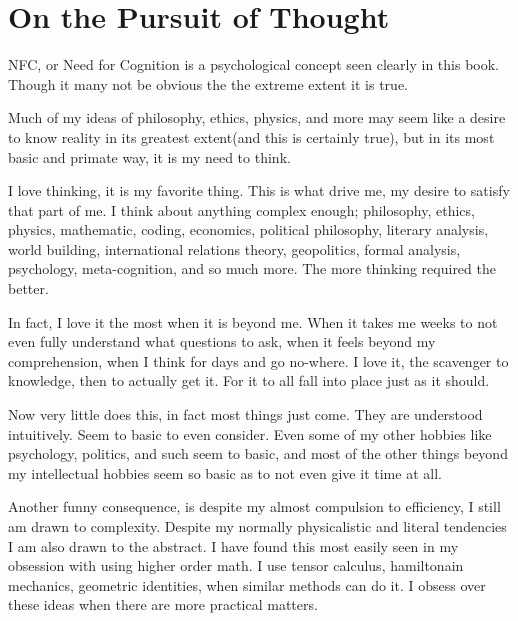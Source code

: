 \section{On the Pursuit of Thought}
\par NFC, or Need for Cognition is a psychological concept seen clearly in this book. Though it many not be obvious the the extreme extent it is true.
\par Much of my ideas of philosophy, ethics, physics, and more may seem like a desire to know reality in its greatest extent(and this is certainly true), but in its most basic and primate way, it is my need to think.
\par I love thinking, it is my favorite thing. This is what drive me, my desire to satisfy that part of me. I think about anything complex enough; philosophy, ethics, physics, mathematic, coding, economics, political philosophy, literary analysis, world building, international relations theory, geopolitics, formal analysis, psychology, meta-cognition, and so much more. The more thinking required the better.
\par In fact, I love it the most when it is beyond me. When it takes me weeks to not even fully understand what questions to ask, when it feels beyond my comprehension, when I think for days and go no-where. I love it, the scavenger to knowledge, then to actually get it. For it to all fall into place just as it should.
\par Now very little does this, in fact most things just come. They are understood intuitively. Seem to basic to even consider. Even some of my other hobbies like psychology, politics, and such seem to basic, and most of the other things beyond my intellectual hobbies seem so basic as to not even give it time at all.
\par Another funny consequence, is despite my almost compulsion to efficiency, I still am drawn to complexity. Despite my normally physicalistic and literal tendencies I am also drawn to the abstract. I have found this most easily seen in my obsession with using higher order math. I use tensor calculus, hamiltonain mechanics, geometric identities, when similar methods can do it. I obsess over these ideas when there are more practical matters. 
